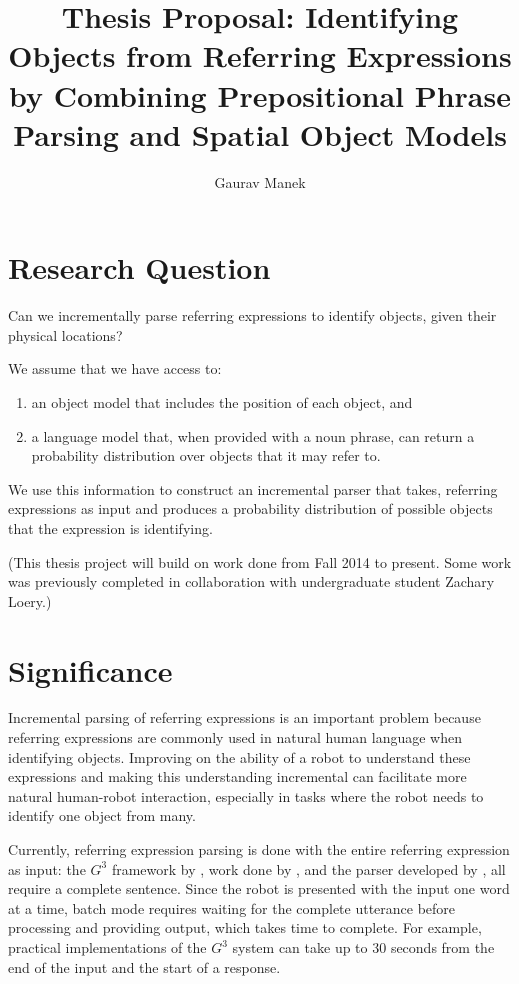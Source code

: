 \documentclass[letterpaper,10pt]{article}
\title{Thesis Proposal: Identifying Objects from Referring Expressions by Combining Prepositional Phrase Parsing and Spatial Object Models}
\author{Gaurav Manek}
\begin{document}
\maketitle
\vfill

\section{Research Question}

Can we incrementally parse referring expressions to identify objects, given their physical locations?

We assume that we have access to:
\begin{enumerate}[topsep=0pt,itemsep=-1ex,partopsep=1ex,parsep=1ex]
 \item an object model that includes the position of each object, and
 \item a language model that, when provided with a noun phrase, can return a probability distribution over objects that it may refer to.
\end{enumerate}

We use this information to construct an incremental parser that takes, referring expressions as input and produces a probability distribution of possible objects that the expression is identifying.

(This thesis project will build on work done from Fall 2014 to present. Some work was previously completed in collaboration with undergraduate student Zachary Loery.)

\section{Significance}

Incremental parsing of referring expressions is an important problem because referring expressions are commonly used in natural human language when identifying objects. Improving on the ability of a robot to understand these expressions and making this understanding incremental can facilitate more natural human-robot interaction, especially in tasks where the robot needs to identify one object from many.

Currently, referring expression parsing is done with the entire referring expression as input: the $G^3$ framework by \citet{tellex2011understanding}, work done by \citet{UW_RSE_ICML2012}, and the parser developed by \citet{artzi2013weakly}, all require a complete sentence. Since the robot is presented with the input one word at a time, batch mode requires waiting for the complete utterance before processing and providing output, which takes time to complete. For example, practical implementations of the $G^3$ system can take up to 30 seconds from the end of the input and the start of a response. 
\end{document}
